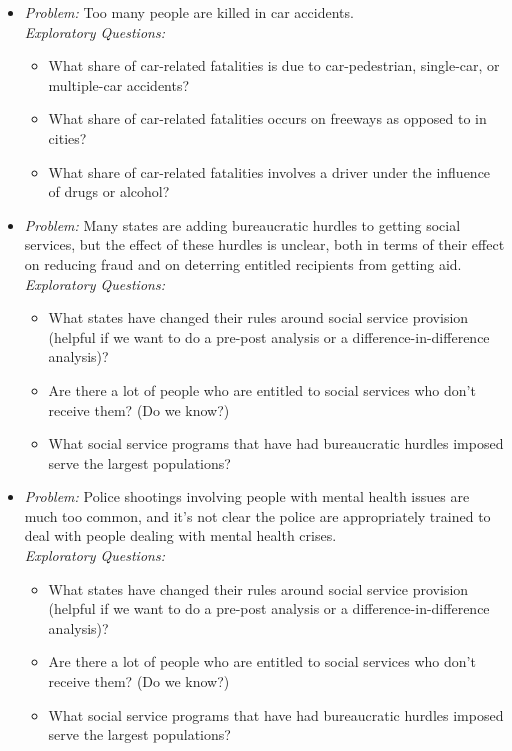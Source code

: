 \documentclass[12pt]{article}
\begin{document}
\begin{itemize}
    \item \emph{Problem:} Too many people are killed in car accidents. \\
    \emph{Exploratory Questions:}
    \begin{itemize}
        \item What share of car-related fatalities is due to car-pedestrian, single-car, or multiple-car accidents?
        \item What share of car-related fatalities occurs on freeways as opposed to in cities?
        \item What share of car-related fatalities involves a driver under the influence of drugs or alcohol?
    \end{itemize}
    \item \emph{Problem:} Many states are adding bureaucratic hurdles to getting social services, but the effect of these hurdles is unclear, both in terms of their effect on reducing fraud and on deterring entitled recipients from getting aid.  \\
    \emph{Exploratory Questions:}
    \begin{itemize}
        \item What states have changed their rules around social service provision (helpful if we want to do a pre-post analysis or a difference-in-difference analysis)?
        \item Are there a lot of people who are entitled to social services who don't receive them? (Do we know?)
        \item What social service programs that have had bureaucratic hurdles imposed serve the largest populations?
    \end{itemize}
    \item \emph{Problem:} Police shootings involving people with mental health issues are much too common, and it's not clear the police are appropriately trained to deal with people dealing with mental health crises. \\
    \emph{Exploratory Questions:}
    \begin{itemize}
        \item What states have changed their rules around social service provision (helpful if we want to do a pre-post analysis or a difference-in-difference analysis)?
        \item Are there a lot of people who are entitled to social services who don't receive them? (Do we know?)
        \item What social service programs that have had bureaucratic hurdles imposed serve the largest populations?
    \end{itemize}
\end{itemize}
\end{document}

